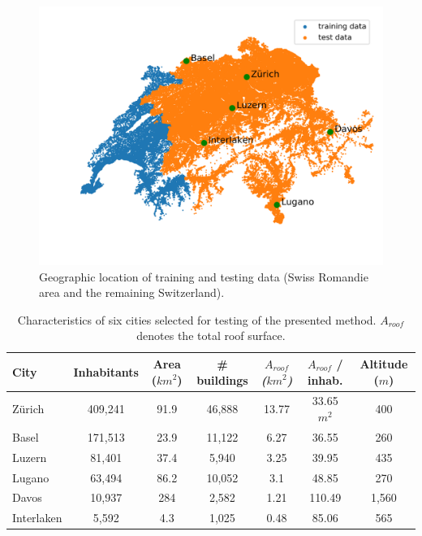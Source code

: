 \begin{figure}[tb]
\centering\includegraphics[width=0.5\linewidth]{images/Figs/train_test_w_cities.png}
\caption{Geographic location of training and testing data (Swiss Romandie area and the remaining Switzerland).}
\label{fig:chile_case_study}
\end{figure}

\begin{table}[tb]
\centering
\footnotesize
\begin{tabular}{lcccccc}
\hline
\textbf{City} & \textbf{Inhabitants} & \textbf{Area ($km^2$)} & \textbf{\# buildings} & \textit{\textbf{$A_{roof}$ ($km^2$)}} & \textbf{$A_{roof}$ / inhab.} & \textbf{Altitude ($m$)} \\ \hline
Zürich        & 409,241              & 91.9                & 46,888                & 13.77                         & 33.65 $m^2$                & 400                   \\
Basel         & 171,513              & 23.9                & 11,122                & 6.27                          & 36.55                   & 260                   \\
Luzern        & 81,401               & 37.4                & 5,940                 & 3.25                          & 39.95                   & 435                   \\
Lugano        & 63,494               & 86.2                & 10,052                & 3.1                           & 48.85                   & 270                   \\
Davos         & 10,937               & 284                 & 2,582                 & 1.21                          & 110.49                  & 1,560                 \\
Interlaken    & 5,592                & 4.3                 & 1,025                 & 0.48                          & 85.06                   & 565                   \\ \hline
\end{tabular}\caption{Characteristics of six cities selected for testing of the presented method. $A_{roof}$ denotes the total roof surface.}
\label{tab:chile_cities}
\end{table}

